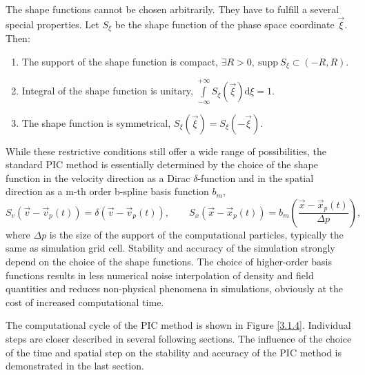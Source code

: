 The shape functions cannot be chosen arbitrarily. They have to fulfill a several special properties. Let $ S_{\xi} $ be the shape function of the phase space coordinate $ \vec{\xi} $. Then:
\begin{enumerate}[nolistsep, topsep=5pt]
\item The support of the shape function is compact, $ \exists R > 0, \: \mathrm{supp} \: S_{\xi} \subset \left(-R, R\right) $.
\item Integral of the shape function is unitary, $ \int\limits_{-\infty}^{+\infty} S_{\xi}\left(\vec{\xi}\right)  \mathrm{d} \xi = 1 $.
\item The shape function is symmetrical, $ S_{\xi}\left(\vec{\xi}\right) = S_{\xi}\left(-\vec{\xi}\right) $.
\end{enumerate}

While these restrictive conditions still offer a wide range of possibilities, the standard PIC method is essentially determined by the choice of the shape function in the velocity direction as a Dirac $ \delta $-function and in the spatial direction as a m-th order b-spline basis function $ b_{m} $,
\begin{equation}
\label{3.1.3}
S_{v}\left(\vec{v} - \vec{v}_{p}\left(t\right)\right) = \delta\left(\vec{v} - \vec{v}_{p}\left(t\right)\right), \qquad S_{x}\left(\vec{x} - \vec{x}_{p}\left(t\right)\right)  = b_{m}\left(\frac{\vec{x} - \vec{x}_{p}\left(t\right)}{\Delta p}\right),
\end{equation}
where $ \Delta p $ is the size of the support of the computational particles, typically the same as simulation grid cell. Stability and accuracy of the simulation strongly depend on the choice of the shape functions. The choice of higher-order basis functions results in less numerical noise interpolation of density and field quantities and reduces non-physical phenomena in simulations, obviously at the cost of increased computational time.

The computational cycle of the PIC method is shown in Figure \ref{3.1.4}. Individual steps are closer described in several following sections. The influence of the choice of the time and spatial step on the stability and accuracy of the PIC method is demonstrated in the last section.

